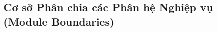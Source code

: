 \documentclass[12pt,a4paper]{article}
\begin{document}
\subsection{Cơ sở Phân chia các Phân hệ Nghiệp vụ (Module Boundaries)}
\end{document}
